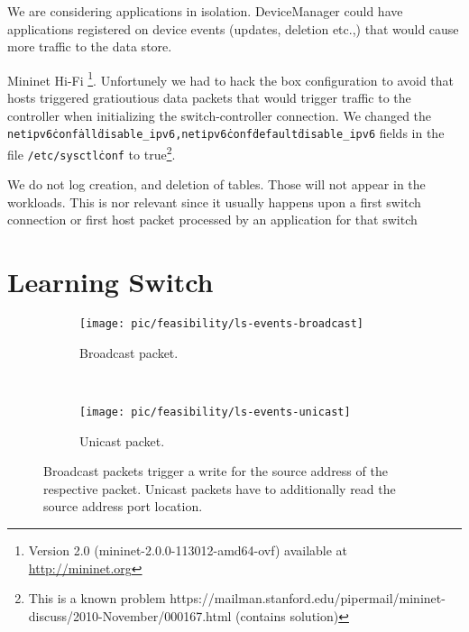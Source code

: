 \documentclass[12pt,openright,twoside]{report}
\title{\PEITITULO}
\author{\PEIAutor}
\begin{document}
\label{sec:feasibility:apps}
\glsresetall

We are considering applications in isolation. DeviceManager could have
applications registered on device events (updates, deletion etc.,)
that would cause more traffic to the data store. 
 


Mininet  Hi-Fi \cite{Handigol:2012tg}\footnote{Version 2.0 (mininet-2.0.0-113012-amd64-ovf) available at \url{http://mininet.org}}. Unfortunely we had to hack the box configuration to avoid that hosts  triggered gratioutious data packets that would  trigger traffic to the controller when initializing the switch-controller connection. We changed the \texttt{net\.ipv6\.conf\.all\.disable\_ipv6,net\.ipv6\.conf\.default\.disable\_ipv6} fields in the file \texttt{/etc/sysctl\.conf} to true\footnote{This is a known problem https://mailman.stanford.edu/pipermail/mininet-discuss/2010-November/000167.html (contains solution)}. 

We do not log creation, and deletion of tables. Those will not appear in the workloads. This is nor relevant since it usually happens upon a first switch connection or first host packet processed by an application  for that switch


\section{Learning Switch}
\label{sec:feasibility:ls}
\glsresetall

\begin{figure}[ht]

  \begin{subfigure}[b]{0.5\textwidth}
                \centering
                \texttt{[image: pic/feasibility/ls-events-broadcast]}
                \caption{Broadcast packet.}
                \label{fig:ls:interaction:broadcast}
        \end{subfigure}%
        ~
        \begin{subfigure}[b]{0.5\textwidth}
                \centering
                \texttt{[image: pic/feasibility/ls-events-unicast]}
                \caption{Unicast packet.}
                \label{fig:ls:interaction:unicast}
        \end{subfigure}
        \caption[Learning Switch workloads]{Broadcast packets trigger a write for the source address of the respective packet. Unicast packets have to additionally read the source address port location.}
        \label{fig:ls:interaction}
\end{figure}
\end{document}
